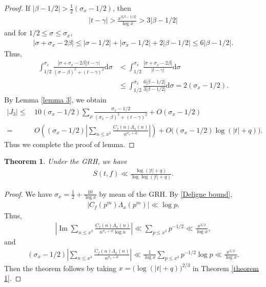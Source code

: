 \documentclass[11pt,reqno]{amsart}
\newcommand{\bna}{\begin{eqnarray*}}
\newcommand{\ena}{\end{eqnarray*}}
\numberwithin{equation}{section}
\theoremstyle{plain}
\newtheorem{theorem}[lemma]{Theorem}
\theoremstyle{definition}
\renewcommand{\Im}{\operatorname{Im}}
\begin{document}
\begin{proof}
If $|\beta-1/2|>\frac{1}{2}(\sigma_x-1/2)$, then
\bna
|t-\gamma|>\frac{x^{3|\beta-1/2|}}{\log x}>3|\beta-1/2|
\ena
and for $1/2\leq\sigma\leq\sigma_x$,
\begin{equation*}
\begin{split}
|\sigma+\sigma_x-2\beta|\leq |\sigma-1/2|+|\sigma_x-1/2|+2|\beta-1/2|\leq 6|\beta-1/2|.
\end{split}
\end{equation*}
Thus,
\begin{equation*}
\begin{split}
\int_{1/2}^{\sigma_x}
 \frac{|\sigma+\sigma_x-2\beta||t-\gamma|}
{(\sigma-\beta)^2+(t-\gamma)^2}\mathrm{d}\sigma
&<\int_{1/2}^{\sigma_x}\frac{|\sigma+\sigma_x-2\beta|}
{|t-\gamma|}\mathrm{d}\sigma\\
&\leq \int_{1/2}^{\sigma_x}\frac{6|\beta-1/2|}
{3|\beta-1/2|}\mathrm{d}\sigma=2(\sigma_x-1/2).
\end{split}
\end{equation*}
By Lemma \ref{lemma 3}, we obtain
\begin{equation*}
\begin{split}
|J_3|\leq&\,10(\sigma_x-1/2)\sum_\rho\frac{\sigma_x-1/2}{(\sigma_x-\beta)^2+(t-\gamma)^2}
+O(\sigma_x-1/2)\\
=&\,O\left((\sigma_x-1/2)\left|\sum_{n\leq x^3} \frac{C_f(n)\Lambda_x(n)}{n^{\sigma_x+it}}\right|\right)
+O\big((\sigma_x-1/2)\log(|t|+q)\big).
\end{split}
\end{equation*}
Thus we complete the proof of lemma.
\end{proof}
\begin{theorem}
Under the \textrm{GRH}, we have
\bna
S(t,f)\ll\frac{\log(|t|+q)}{\log\log(|t|+q)}.
\ena
\end{theorem}
\begin{proof}
We have $\sigma_x=\frac{1}{2}+\frac{10}{\log x}$ by mean of the GRH.
By \eqref{Deligne bound},
\bna
|C_f(p^m)\Lambda_x(p^m)|\ll \log p.
\ena
Thus,
\bna
\left|\Im\sum_{n\leq x^3}\frac{C_f(n)\Lambda_x(n)}{n^{\sigma_x+it}\log n}\right|
\ll \sum_{p\leq x^3}p^{-1/2}\ll \frac{x^{3/2}}{\log x},
\ena
and
\bna
(\sigma_x-1/2)\left|\sum_{n\leq x^3} \frac{C_f(n)\Lambda_x(n)}{n^{\sigma_x+it}}\right|
\ll \frac{1}{\log x}\sum_{p\leq x^3}p^{-1/2}\log p\ll \frac{x^{3/2}}{\log x}.
\ena
Then the theorem follows by taking $x=\big(\log(|t|+q)\big)^{2/3}$ in Theorem \ref{theorem 1}.
\end{proof}
\end{document}
